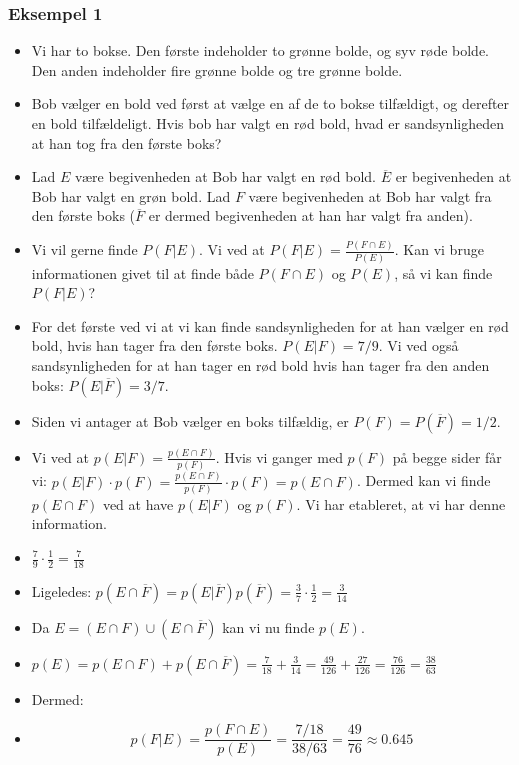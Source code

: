 \documentclass{beamer}
\begin{document}
\begin{frame}[allowframebreaks]
  \frametitle{Eksempel 1}

  \begin{itemize}
  \item Vi har to bokse. Den første indeholder to grønne bolde, og syv røde bolde. Den anden indeholder fire grønne bolde og tre grønne bolde.
  \item Bob vælger en bold ved først at vælge en af de to bokse tilfældigt, og derefter en bold tilfældeligt. Hvis bob har valgt en rød bold, hvad er sandsynligheden at han tog fra den første boks? 
  \item Lad $E$ være begivenheden at Bob har valgt en rød bold. $\overline{E}$ er begivenheden at Bob har valgt en grøn bold. Lad $F$ være begivenheden at Bob har valgt fra den første boks ($\overline{F}$ er dermed begivenheden at han har valgt fra anden).
  \item Vi vil gerne finde $P(F|E)$. Vi ved at $P(F|E) = \frac{P(F \cap E)}{P(E)}$. Kan vi bruge informationen givet til at finde både $P(F \cap E)$ og $P(E)$, så vi kan finde $P(F|E)$?
    \item For det første ved vi at vi kan finde sandsynligheden for at han vælger en rød bold, hvis han tager fra den første boks. $P(E|F) = 7/9$. Vi ved også sandsynligheden for at han tager en rød bold hvis han tager fra den anden boks: $P(E|\overline{F}) = 3/7$. 
    \item Siden vi antager at Bob vælger en boks tilfældig, er $P(F) = P(\overline{F}) = 1/2$.
    \item Vi ved at $p(E|F) = \frac{p(E \cap F)}{p(F)}$. Hvis vi ganger med $p(F)$ på begge sider får vi: $p(E|F) \cdot p(F) = \frac{p(E \cap F)}{p(F)} \cdot p(F) = p(E \cap F)$. Dermed kan vi finde $p(E \cap F)$ ved at have $p(E|F)$ og $p(F)$. Vi har etableret, at vi har denne information.
    \item $\frac{7}{9}\cdot \frac{1}{2} = \frac{7}{18}$
    \item Ligeledes: $p(E \cap \overline{F}) = p(E| \overline{F}) p(\overline{F}) = \frac{3}{7} \cdot \frac{1}{2} = \frac{3}{14}$
    \item Da $E = (E \cap F) \cup (E \cap \overline{F})$ kan vi nu finde $p(E)$.
    \item $p(E) = p(E \cap F) + p(E \cap \overline{F}) = \frac{7}{18} + \frac{3}{14} = \frac{49}{126} + \frac{27}{126} = \frac{76}{126} = \frac{38}{63}$
    \item Dermed:
    \item \[ p(F|E) = \frac{p(F \cap E)}{p(E)} = \frac{7/18}{38/63} = \frac{49}{76} \approx 0.645 \]
  \end{itemize}
\end{frame}
\end{document}
